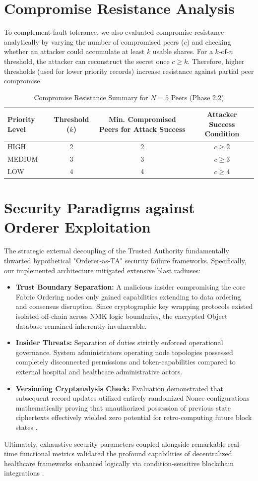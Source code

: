 \section{Compromise Resistance Analysis}
To complement fault tolerance, we also evaluated compromise resistance analytically by varying the number of compromised peers ($c$) and checking whether an attacker could accumulate at least $k$ usable shares. For a $k$-of-$n$ threshold, the attacker can reconstruct the secret once $c \geq k$. Therefore, higher thresholds (used for lower priority records) increase resistance against partial peer compromise.

\begin{table}[ht]
\centering
\begin{tabular}{|l|c|c|c|}
\hline
\textbf{Priority Level} & \textbf{Threshold ($k$)} & \textbf{Min. Compromised Peers for Attack Success} & \textbf{Attacker Success Condition} \\
\hline
HIGH & 2 & 2 & $c \geq 2$ \\
MEDIUM & 3 & 3 & $c \geq 3$ \\
LOW & 4 & 4 & $c \geq 4$ \\
\hline
\end{tabular}
\caption{Compromise Resistance Summary for $N=5$ Peers (Phase 2.2)}
\label{tab:compromise}
\end{table}

\section{Security Paradigms against Orderer Exploitation}
The strategic external decoupling of the Trusted Authority fundamentally thwarted hypothetical "Orderer-as-TA" security failure frameworks. Specifically, our implemented architecture mitigated extensive blast radiuses:
\begin{itemize}
    \item \textbf{Trust Boundary Separation:} A malicious insider compromising the core Fabric Ordering nodes only gained capabilities extending to data ordering and consensus disruption. Since cryptographic key wrapping protocols existed isolated off-chain across NMK logic boundaries, the encrypted Object database remained inherently invulnerable. 
    \item \textbf{Insider Threats:} Separation of duties strictly enforced operational governance. System administrators operating node topologies possessed completely disconnected permissions and token-capabilities compared to external hospital and healthcare administrative actors. 
    \item \textbf{Versioning Cryptanalysis Check:} Evaluation demonstrated that subsequent record updates utilized entirely randomized Nonce configurations mathematically proving that unauthorized possession of previous state ciphertexts effectively wielded zero potential for retro-computing future block states \cite{samy2020fog}.
\end{itemize}

Ultimately, exhaustive security parameters coupled alongside remarkable real-time functional metrics validated the profound capabilities of decentralized healthcare frameworks enhanced logically via condition-sensitive blockchain integrations \cite{shorfuzzaman2021blockchain}.
